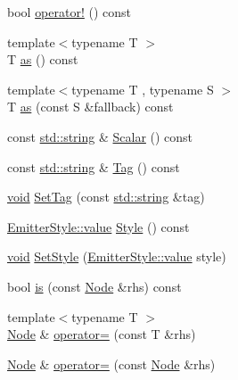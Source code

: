 \begin{DoxyCompactItemize}
\item 
bool \mbox{\hyperlink{class_y_a_m_l_1_1_node_acf62c3257292c6d67945835785a01497}{operator!}} () const
\item 
{\footnotesize template$<$typename T $>$ }\\T \mbox{\hyperlink{class_y_a_m_l_1_1_node_aa851b856bd5972b42b0b1976adc90606}{as}} () const
\item 
{\footnotesize template$<$typename T , typename S $>$ }\\T \mbox{\hyperlink{class_y_a_m_l_1_1_node_a5ea7214df4819515ef54665727fcb751}{as}} (const S \&fallback) const
\item 
const \mbox{\hyperlink{glad_8h_ac83513893df92266f79a515488701770}{std\+::string}} \& \mbox{\hyperlink{class_y_a_m_l_1_1_node_a774e1077cccab9a72137e0634557a275}{Scalar}} () const
\item 
const \mbox{\hyperlink{glad_8h_ac83513893df92266f79a515488701770}{std\+::string}} \& \mbox{\hyperlink{class_y_a_m_l_1_1_node_a58aaece650ba5da327f7ba3b2223d60c}{Tag}} () const
\item 
\mbox{\hyperlink{glad_8h_a950fc91edb4504f62f1c577bf4727c29}{void}} \mbox{\hyperlink{class_y_a_m_l_1_1_node_a8c9b93527cb12dd9b5d464adcbd8c781}{Set\+Tag}} (const \mbox{\hyperlink{glad_8h_ac83513893df92266f79a515488701770}{std\+::string}} \&tag)
\item 
\mbox{\hyperlink{struct_y_a_m_l_1_1_emitter_style_ae86640662c85ce6062a37f9636b6959f}{Emitter\+Style\+::value}} \mbox{\hyperlink{class_y_a_m_l_1_1_node_ac1e18c6a11d984560dedbf4ca816d87e}{Style}} () const
\item 
\mbox{\hyperlink{glad_8h_a950fc91edb4504f62f1c577bf4727c29}{void}} \mbox{\hyperlink{class_y_a_m_l_1_1_node_a92be22e98028ac4e126ac8f036ed9e45}{Set\+Style}} (\mbox{\hyperlink{struct_y_a_m_l_1_1_emitter_style_ae86640662c85ce6062a37f9636b6959f}{Emitter\+Style\+::value}} style)
\item 
bool \mbox{\hyperlink{class_y_a_m_l_1_1_node_a35acb7bdd8751c583394e743f47908c7}{is}} (const \mbox{\hyperlink{class_y_a_m_l_1_1_node}{Node}} \&rhs) const
\item 
{\footnotesize template$<$typename T $>$ }\\\mbox{\hyperlink{class_y_a_m_l_1_1_node}{Node}} \& \mbox{\hyperlink{class_y_a_m_l_1_1_node_a117e05460b9d13f0954f4ea16c7c3dc9}{operator=}} (const T \&rhs)
\item 
\mbox{\hyperlink{class_y_a_m_l_1_1_node}{Node}} \& \mbox{\hyperlink{class_y_a_m_l_1_1_node_ac183724c7c53d4f96453adbc421d3e27}{operator=}} (const \mbox{\hyperlink{class_y_a_m_l_1_1_node}{Node}} \&rhs)

\end{DoxyCompactItemize}
